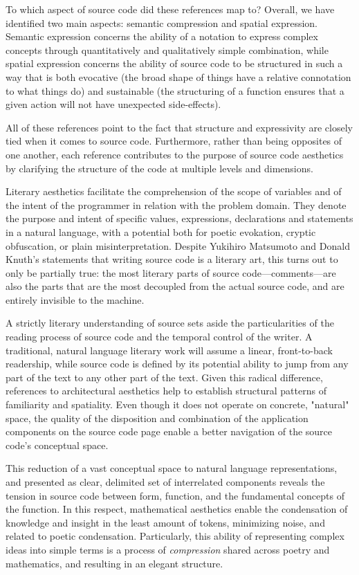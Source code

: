To which aspect of source code did these references map to? Overall, we have identified two main aspects: semantic compression and spatial expression. Semantic expression concerns the ability of a notation to express complex concepts through quantitatively and qualitatively simple combination, while spatial expression concerns the ability of source code to be structured in such a way that is both evocative (the broad shape of things have a relative connotation to what things do) and sustainable (the structuring of a function ensures that a given action will not have unexpected side-effects).

All of these references point to the fact that structure and expressivity are closely tied when it comes to source code. Furthermore, rather than being opposites of one another, each reference contributes to the purpose of source code aesthetics by clarifying the structure of the code at multiple levels and dimensions.

Literary aesthetics facilitate the comprehension of the scope of variables and of the intent of the programmer in relation with the problem domain. They denote the purpose and intent of specific values, expressions, declarations and statements in a natural language, with a potential both for poetic evokation, cryptic obfuscation, or plain misinterpretation. Despite Yukihiro Matsumoto and Donald Knuth's statements that writing source code is a literary art, this turns out to only be partially true: the most literary parts of source code—comments—are also the parts that are the most decoupled from the actual source code, and are entirely invisible to the machine.

A strictly literary understanding of source sets aside the particularities of the reading process of source code and the temporal control of the writer. A traditional, natural language literary work will assume a linear, front-to-back readership, while source code is defined by its potential ability to jump from any part of the text to any other part of the text. Given this radical difference, references to architectural aesthetics help to establish structural patterns of familiarity and spatiality. Even though it does not operate on concrete, "natural" space, the quality of the disposition and combination of the application components on the source code page enable a better navigation of the source code's conceptual space.

This reduction of a vast conceptual space to natural language representations, and presented as clear, delimited set of interrelated components  reveals the tension in source code between form, function, and the fundamental concepts of the function. In this respect, mathematical aesthetics enable the condensation of knowledge and insight in the least amount of tokens, minimizing noise, and related to poetic condensation. Particularly, this ability of representing complex ideas into simple terms is a process of \emph{compression} shared across poetry and mathematics, and resulting in an elegant structure.

